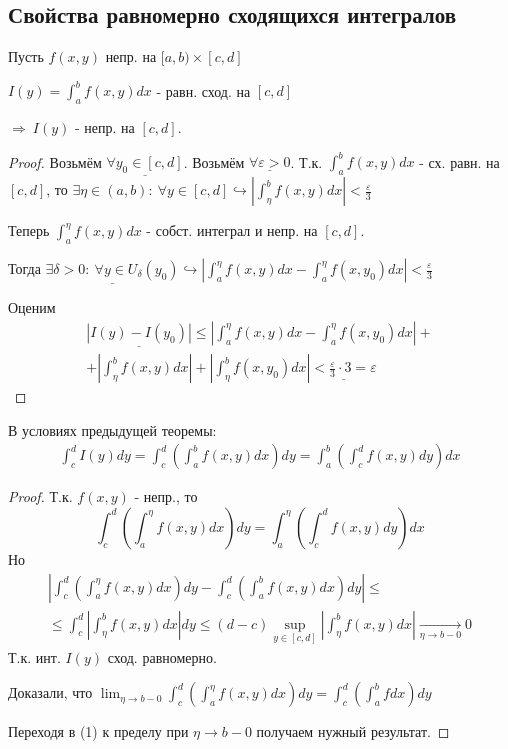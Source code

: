 \documentclass{article}
\theoremstyle{definition}
\numberwithin{theorem}{section}
\numberwithin{lemma}{section}
\numberwithin{definition}{section}
\numberwithin{corollary}{section}
\numberwithin{equation}{section}
\let\epsilon\varepsilon
\let\implies\Rightarrow
\let\true\hookrightarrow
\begin{document}
\subsection{Свойства равномерно сходящихся интегралов}
\begin{theorem}[О непрерывности]
  Пусть $f(x,y)$ непр. на $[a,b)\times [c,d]$

  $I(y)=\int_{a}^{b}f(x,y)dx$ - равн. сход. на $[c,d]$

  $\implies \ I(y)$ - непр. на $[c,d]$.
\end{theorem}
\begin{proof}
  Возьмём $\underline{\forall y_0 \in [c,d]}$. Возьмём $\underline{\forall \epsilon>0}$.
  Т.к. $\int_{a}^{b}f(x,y)dx$ - сх. равн. на $[c,d]$, то
  $\exists \eta \in (a,b): \ \forall y \in [c,d] \true |\int_{\eta}^{b}f(x,y)dx|<\frac{\epsilon}{3}$

  Теперь $\int_{a}^{\eta}f(x,y)dx$ - собст. интеграл и непр. на $[c,d]$.

  Тогда $\underline{\exists \delta >0: \ \forall y \in U_\delta(y_0)} \true |\int_{a}^{\eta}f(x,y)dx - \int_{a}^{\eta}f(x,y_0)dx|<\frac{\epsilon}{3}$

  Оценим
  \begin{gather*}
    \underline{|I(y) - I(y_0)|}\le |\int_{a}^{\eta}f(x,y)dx-\int_{a}^{\eta}f(x,y_0)dx| + \\ 
    + |\int_{\eta}^{b}f(x,y)dx|+|\int_{\eta}^{b}f(x,y_0)dx|\underline{< \frac{\epsilon}{3}\cdot 3 = \epsilon}
  \end{gather*}
\end{proof}
\begin{theorem}
  В условиях предыдущей теоремы:
  \begin{gather*}
    \int_{c}^{d}I(y)dy=\int_{c}^{d}(\int_{a}^{b}f(x,y)dx)dy=\int_{a}^{b}(\int_{c}^{d}f(x,y)dy)dx
  \end{gather*}
\end{theorem}
\begin{proof}
  Т.к. $f(x,y)$ - непр., то
  \[
    \int_{c}^{d}(\int_{a}^{\eta}f(x,y)dx)dy=\int_{a}^{\eta}(\int_{c}^{d}f(x,y)dy)dx \tag{1}
  \]
  Но
  \begin{gather*}
    |\int_{c}^{d}(\int_{a}^{\eta}f(x,y)dx)dy-\int_{c}^{d}(\int_{a}^{b}f(x,y)dx)dy| \le \\ 
    \le \int_{c}^{d}|\int_{\eta}^{b}f(x,y)dx|dy \le (d-c)\sup_{y\in [c,d]}|\int_{\eta}^{b}f(x,y)dx|\underset{\eta\to b-0}{\to}0
  \end{gather*}
  Т.к. инт. $I(y)$ сход. равномерно.

  Доказали, что $\lim_{\eta\to b-0}\int_{c}^{d}(\int_{a}^{\eta}f(x,y)dx)dy=\int_{c}^{d}(\int_{a}^{b}fdx)dy$

  Переходя в (1) к пределу при $\eta\to b-0$ получаем нужный результат.
\end{proof}
\end{document}
